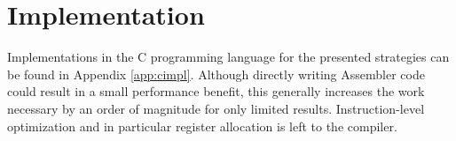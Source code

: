 \chapter{Implementation}

Implementations in the C programming language for the presented strategies can
be found in Appendix \ref{app:cimpl}. Although directly writing Assembler code could
result in a small performance benefit, this generally increases the work
necessary by an order of magnitude for only limited results. Instruction-level
optimization and in particular register allocation is left to the compiler.
